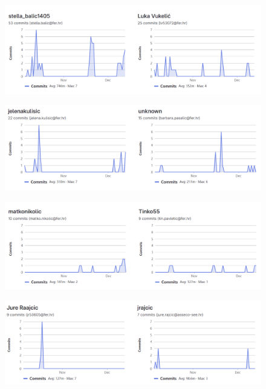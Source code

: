 	\begin{figure}[H]
		\includegraphics[scale=0.3]{slike/commits2.PNG} %
		\centering
		\label{}
	\end{figure}
   \begin{figure}[H]
	\includegraphics[scale=0.3]{slike/commits3.PNG} %
	\centering
	\label{}
\end{figure}
\begin{figure}[H]
	\includegraphics[scale=0.3]{slike/commits4.PNG} %
	\centering
	\label{}
\end{figure}
\begin{figure}[H]
	\includegraphics[scale=0.3]{slike/commits5.PNG} %
	\centering
	\label{}
\end{figure}
		
	